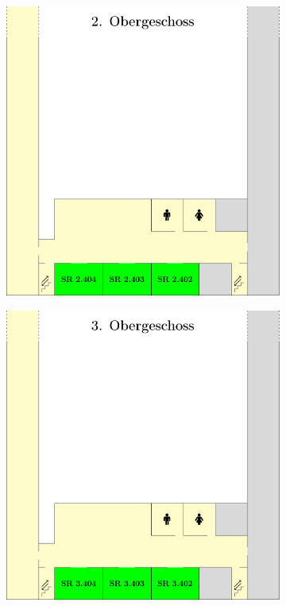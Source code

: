 \begin{figure}[H]
\centering
\begin{subfigure}[h]{0.62\textwidth}
\centering
\includegraphics[width=\linewidth]{raumplan/og2}
\vspace*{5mm}
\end{subfigure}
\begin{subfigure}[h]{0.62\textwidth}
\centering
\includegraphics[width=\linewidth]{raumplan/og3}
\end{subfigure}
\end{figure}
